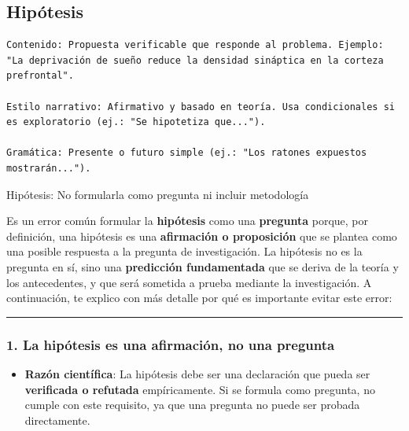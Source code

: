 \documentclass[
  10pt]{article}
\providecommand{\tightlist}{%
  \setlength{\itemsep}{0pt}\setlength{\parskip}{0pt}}\usepackage{longtable,booktabs,array}
\begin{document}
\subsection{Hipótesis}\label{hipuxf3tesis}

\begin{tcolorbox}[enhanced jigsaw, colframe=quarto-callout-tip-color-frame, toprule=.15mm, opacitybacktitle=0.6, arc=.35mm, coltitle=black, title=\textcolor{quarto-callout-tip-color}{\faLightbulb}\hspace{0.5em}{Tip}, breakable, rightrule=.15mm, bottomtitle=1mm, titlerule=0mm, leftrule=.75mm, opacityback=0, colbacktitle=quarto-callout-tip-color!10!white, colback=white, left=2mm, bottomrule=.15mm, toptitle=1mm]

\begin{verbatim}
Contenido: Propuesta verificable que responde al problema. Ejemplo: "La deprivación de sueño reduce la densidad sináptica en la corteza prefrontal".

Estilo narrativo: Afirmativo y basado en teoría. Usa condicionales si es exploratorio (ej.: "Se hipotetiza que...").

Gramática: Presente o futuro simple (ej.: "Los ratones expuestos mostrarán...").
\end{verbatim}

Hipótesis: No formularla como pregunta ni incluir metodología

Es un error común formular la \textbf{hipótesis} como una
\textbf{pregunta} porque, por definición, una hipótesis es una
\textbf{afirmación o proposición} que se plantea como una posible
respuesta a la pregunta de investigación. La hipótesis no es la pregunta
en sí, sino una \textbf{predicción fundamentada} que se deriva de la
teoría y los antecedentes, y que será sometida a prueba mediante la
investigación. A continuación, te explico con más detalle por qué es
importante evitar este error:

\begin{center}\rule{0.5\linewidth}{0.5pt}\end{center}

\subsubsection{\texorpdfstring{\textbf{1. La hipótesis es una
afirmación, no una
pregunta}}{1. La hipótesis es una afirmación, no una pregunta}}\label{la-hipuxf3tesis-es-una-afirmaciuxf3n-no-una-pregunta}

\begin{itemize}
\tightlist
\item
  \textbf{Razón científica}: La hipótesis debe ser una declaración que
  pueda ser \textbf{verificada o refutada} empíricamente. Si se formula
  como pregunta, no cumple con este requisito, ya que una pregunta no
  puede ser probada directamente.


\end{itemize}
\end{tcolorbox}
\end{document}
